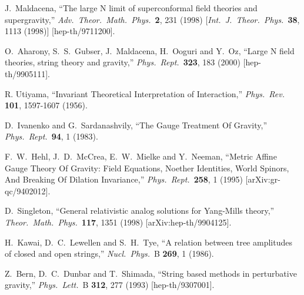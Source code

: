 \documentclass[12pt]{livrev}
\begin{document}
%
\begin{thebibliography}{99}

J.~Maldacena,
``The large N limit of superconformal field theories and supergravity,''
{\it Adv.\ Theor.\ Math.\ Phys.}\  {\bf 2}, 231 (1998)
[{\it Int.\ J.\ Theor.\ Phys.}\  {\bf 38}, 1113 (1998)]
[hep-th/9711200].

O.~Aharony, S.~S.~Gubser, J.~Maldacena, H.~Ooguri and Y.~Oz,
``Large N field theories, string theory and gravity,''
{\it Phys.\ Rept.}\  {\bf 323}, 183 (2000)
[hep-th/9905111].

R. Utiyama, 
``Invariant Theoretical Interpretation of Interaction,''
{\it Phys.\ Rev.} {\bf 101}, 1597-1607 (1956).

D.~Ivanenko and G.~Sardanashvily,
``The Gauge Treatment Of Gravity,''
{\it Phys.\ Rept.}\  {\bf 94}, 1 (1983).

F.~W.~Hehl, J.~D.~McCrea, E.~W.~Mielke and Y.~Neeman,
``Metric Affine Gauge Theory Of Gravity: Field Equations, 
Noether Identities, World Spinors, And Breaking Of Dilation Invariance,''
{\it Phys.\ Rept.}\  {\bf 258}, 1 (1995)
[arXiv:gr-qc/9402012].

D.~Singleton,
``General relativistic analog solutions for Yang-Mills theory,''
{\it Theor.\ Math.\ Phys.}\  {\bf 117}, 1351 (1998)
[arXiv:hep-th/9904125].

H.~Kawai, D.~C.~Lewellen and S.~H.~Tye,
``A relation between tree amplitudes of closed and open strings,''
{\it Nucl.\ Phys.}\ B {\bf 269}, 1 (1986).

Z.~Bern, D.~C.~Dunbar and T.~Shimada,
``String based methods in perturbative gravity,''
{\it Phys.\ Lett.}\ B {\bf 312}, 277 (1993)
[hep-th/9307001].


\end{thebibliography}
\end{document}
